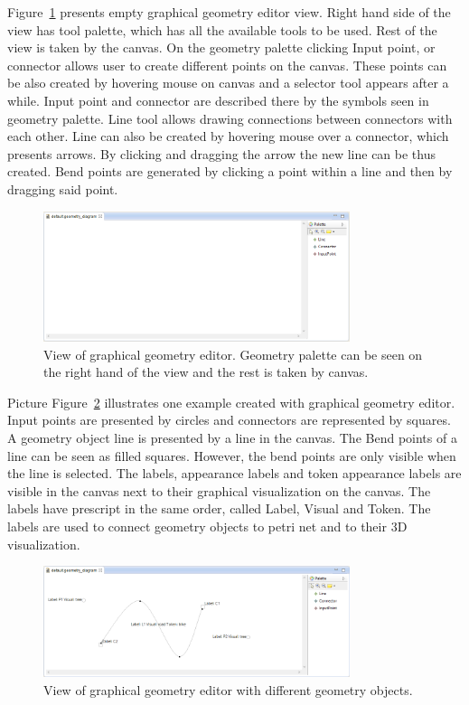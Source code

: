 Figure~\ref{fig:ge-diag-empty} presents empty graphical geometry editor view. Right hand side of the view has tool palette, which has all the available tools to be used. Rest of the view is taken by the canvas. On the geometry palette clicking Input point, or connector allows user to create different points on the canvas. These points can be also created by hovering mouse on canvas and a selector tool appears after a while. Input point and connector are described there by the symbols seen in geometry palette. Line tool allows drawing connections between connectors with each other. Line can also be created by hovering mouse over a connector, which presents arrows. By clicking and dragging the arrow the new line can be thus created. Bend points are generated by clicking a point within a line and then by dragging said point. 

\begin{figure}[htp]
\begin{center}
  \includegraphics[width=0.8\textwidth]{image/ge-diag-empty.png}
  \caption{View of graphical geometry editor. Geometry palette can be seen on the right hand of the view and the rest is taken by canvas.}
  \label{fig:ge-diag-empty}
\end{center}
\end{figure}

Picture Figure~\ref{fig:ge-diag-exam} illustrates one example created with graphical geometry editor. Input points are presented by circles and connectors are represented by squares. A geometry object line is presented by a line in the canvas. The Bend points of a line can be seen as filled squares. However, the bend points are only visible when the line is selected. The labels, appearance labels and token appearance labels are visible in the canvas next to their graphical visualization on the canvas. The labels have prescript in the same order, called Label, Visual and Token. The labels are used to connect geometry objects to petri net and to their 3D visualization.

\begin{figure}[htp]
\begin{center}
  \includegraphics[width=0.8\textwidth]{image/ge-diag-exam.png}
  \caption{View of graphical geometry editor with different geometry objects.}
  \label{fig:ge-diag-exam}
\end{center}
\end{figure}

